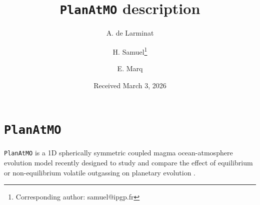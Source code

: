 \documentclass[referee]{aa}
\begin{document}
   \title{{\tt PlanAtMO} description}


%

   \author{A. de Larminat
        \and H. Samuel\fnmsep\thanks{Corresponding author: samuel@ipgp.fr}
        \and E. Marq
        }


   \date{Received March 3, 2026}



   \maketitle


\section{\tt PlanAtMO}

 {\tt PlanAtMO} is a 1D spherically symmetric coupled magma ocean-atmosphere evolution model recently designed to study and compare the effect of equilibrium  or non-equilibrium volatile outgassing on planetary evolution \citep{salvador2023convective,Walbecq.etal2025}.
\end{document}

